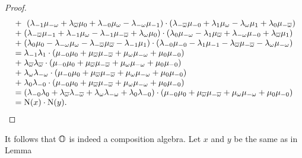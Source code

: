 \begin{proof}
\begin{equation*}
\begin{array}{r@{\;}c@{\;}l}
			&+& \  (\lambda_{-1} \mu_{-\omega} + \lambda_{\bar{\omega}} \mu_0 + 
			\lambda_{-0} \mu_{\omega} - \lambda_{-\omega} \mu_{-1}) \cdot
			(\lambda_{-\bar{\omega}} \mu_{-0} + \lambda_1 \mu_{\omega} - 
				\lambda_{\omega} \mu_1 + 
				\lambda_0 \mu_{-\bar{\omega}})  \\
				
			&+  &  (\lambda_{-\bar{\omega}} \mu_{-1} + \lambda_{-1} \mu_{\omega} - 
						\lambda_{-1} \mu_{-\bar{\omega}} + \lambda_{\omega} \mu_0)\cdot
					(\lambda_0 \mu_{-\omega} - \lambda_1 \mu_{\bar{\omega}} + \lambda_{-\omega}
			\mu_{-0} + \lambda_{\bar{\omega}} \mu_1) \\
			
			& + &  (\lambda_0 \mu_0 - \lambda_{-\omega} \mu_{\omega} - 
				\lambda_{-\bar{\omega}} \mu_{\bar{\omega}} - \lambda_{-1} \mu_1)\cdot
				(\lambda_{-0} \mu_{-0} - \lambda_1 \mu_{-1} - 
	\lambda_{\bar{\omega}} \mu_{-\bar{\omega}}-\lambda_{\omega}\mu_{-\omega}) \\ 

			& = & \lambda_{-1} \lambda_1 \cdot (\mu_{-0} \mu_0 + \mu_{\bar{\omega}} 
			\mu_{-\bar{\omega}} + \mu_{\omega} \mu_{-\omega} + \mu_{0} \mu_{-0}) \\
			
			& + &  \lambda_{\bar{\omega}} \lambda_{\bar{\omega}} \cdot
			(\mu_{-0} \mu_0 + \mu_{\bar{\omega}} \mu_{-\bar{\omega}} + \mu_{\omega} \mu_{-\omega}
		+ \mu_{0} \mu_{-0}) \\
		
			& + &  \lambda_{\omega} \lambda_{-\omega} \cdot (\mu_{-0} \mu_0 + \mu_{\bar{\omega}} 
			\mu_{-\bar{\omega}} + \mu_{\omega} \mu_{-\omega} + \mu_{0} \mu_{-0}) \\
			
			& + &  \lambda_{0} \lambda_{-0} \cdot (\mu_{-0} \mu_0 + \mu_{\bar{\omega}} 
			\mu_{-\bar{\omega}} + \mu_{\omega} \mu_{-\omega} + \mu_{0} \mu_{-0}) \\
			
			& = & (\lambda_{-0} \lambda_0 + \lambda_{\bar{\omega}} \lambda_{-\bar{\omega}} +
			 \lambda_{\omega} \lambda_{-\omega} + \lambda_{0} \lambda_{-0})\cdot
			 (\mu_{-0} \mu_0 + \mu_{\bar{\omega}} \mu_{-\bar{\omega}} + \mu_{\omega} \mu_{-\omega}
			 + \mu_{0} \mu_{-0}) \\
			 
			& = & \NN(x) \cdot \NN(y).
		\end{array} 
	\end{equation*}
\end{proof}
It follows that $\mathbb{O}$ is indeed a composition algebra. Let $x$ and $y$ be the same as in Lemma

